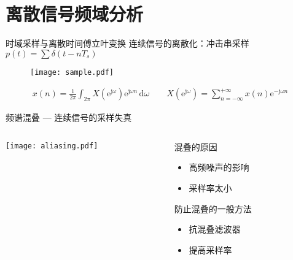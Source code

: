 \documentclass[UTF8]{ctexbeamer}
\begin{document}
\section{离散信号频域分析}


\begin{frame}{时域采样与离散时间傅立叶变换}
    连续信号的离散化：冲击串采样 $p(t) = \sum \delta (t - n T_s) $

    \begin{figure}
        \centering
        \texttt{[image: sample.pdf]}
    \end{figure}

    \begin{tcolorbox}[top=0mm,
        title = 离散时间傅立叶变换（Discrete-Time Fourier Transform）,
        boxrule = 0.3pt,
        fontupper = \normalcolor\small]
        \begin{gather*}
            x(n) = \frac{1}{2\pi} \int_{2\pi} X(\mathrm{e}^{\mathrm{j}\omega}) \mathrm{e}^{\mathrm{j}\omega n}\,\mathrm{d}\omega 
            \qquad
            X(\mathrm{e}^{\mathrm{j}\omega}) = \sum_{n=-\infty}^{+\infty} x(n) \mathrm{e}^{-\mathrm{j}\omega n}            
        \end{gather*}
    \end{tcolorbox}
\end{frame}


\begin{frame}{频谱混叠 --- 连续信号的采样失真}
    \begin{columns}
        \begin{column}{0.53\textwidth}
            \centering
            \texttt{[image: aliasing.pdf]}
        \end{column}
        \begin{column}{0.4\textwidth}
            混叠的原因
            \begin{itemize}
                \item 高频噪声的影响
                \item 采样率太小
            \end{itemize}

            防止混叠的一般方法
            \begin{itemize}
                \item 抗混叠滤波器
                \item 提高采样率
            \end{itemize}
        \end{column}
    \end{columns}
\end{frame}
\end{document}
